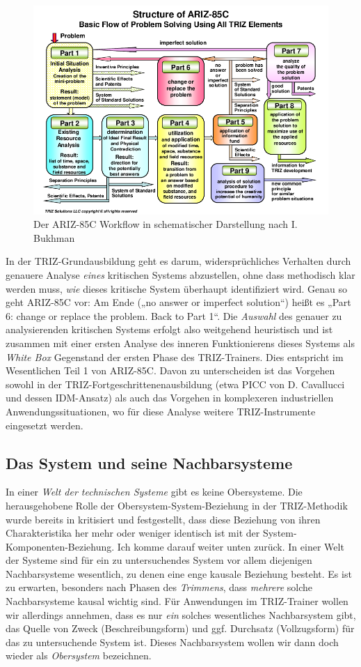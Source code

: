 \documentclass[11pt,a4paper]{article}
\begin{document}
\begin{figure}
  \includegraphics[width=.9\textwidth]{ARIZ-Workflow.png}
  \caption{Der ARIZ-85C Workflow in schematischer Darstellung nach I. Bukhman}
\end{figure}


In der TRIZ-Grundausbildung geht es darum, widersprüchliches Verhalten durch
genauere Analyse \emph{eines} kritischen Systems abzustellen, ohne dass
methodisch klar werden muss, \emph{wie} dieses kritische System überhaupt
identifiziert wird.  Genau so geht ARIZ-85C vor: Am Ende („no answer or
imperfect solution“) heißt es „Part 6: change or replace the problem. Back to
Part 1“. Die \emph{Auswahl} des genauer zu analysierenden kritischen Systems
erfolgt also weitgehend heuristisch und ist zusammen mit einer ersten Analyse
des inneren Funktionierens dieses Systems als \emph{White Box} Gegenstand der
ersten Phase des TRIZ-Trainers.  Dies entspricht im Wesentlichen Teil 1 von
ARIZ-85C.  Davon zu unterscheiden ist das Vorgehen sowohl in der
TRIZ-Fortgeschrittenenausbildung (etwa PICC \cite{Cavallucci} von
D. Cavallucci und dessen IDM-Ansatz) als auch das Vorgehen in komplexeren
industriellen Anwendungssituationen, wo für diese Analyse weitere
TRIZ-Instrumente eingesetzt werden.

\subsection*{Das System und seine Nachbarsysteme}

In einer \emph{Welt der technischen Systeme} gibt es keine Obersysteme. Die
herausgehobene Rolle der Obersystem-System-Beziehung in der TRIZ-Methodik
wurde bereits in \cite[S. 16]{Graebe2020} kritisiert und festgestellt, dass
diese Beziehung von ihren Charakteristika her mehr oder weniger identisch ist
mit der System-Komponenten-Beziehung. Ich komme darauf weiter unten zurück.
In einer Welt der Systeme sind für ein zu untersuchendes System vor allem
diejenigen Nachbarsysteme wesentlich, zu denen eine enge kausale Beziehung
besteht.  Es ist zu erwarten, besonders nach Phasen des \emph{Trimmens}, dass
\emph{mehrere} solche Nachbarsysteme kausal wichtig sind.  Für Anwendungen im
TRIZ-Trainer wollen wir allerdings annehmen, dass es nur \emph{ein} solches
wesentliches Nachbarsystem gibt, das Quelle von Zweck (Beschreibungsform) und
ggf. Durchsatz (Vollzugsform) für das zu untersuchende System ist. Dieses
Nachbarsystem wollen wir dann doch wieder als \emph{Obersystem} bezeichnen.
\end{document}
